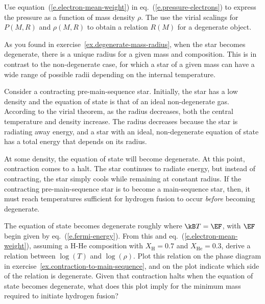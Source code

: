 \begin{exercisebox}
\label{ex.degenerate-mass-radius}
Use equation~(\ref{e.electron-mean-weight}) in eq.~(\ref{e.pressure-electrons}) to express the pressure as a function of mass density $\rho$. The use the virial scalings for $P(M,R)$ and $\rho(M,R)$ to obtain a relation $R(M)$ for a degenerate object.
\end{exercisebox}

As you found in exercise~\ref{ex.degenerate-mass-radius}, when the star becomes degenerate, there is a unique radius for a given mass and composition. This is in contrast to the non-degenerate case, for which a star of a given mass can have a wide range of possible radii depending on the internal temperature.

Consider a contracting pre-main-sequence star. Initially, the star has a low density and the equation of state is that of an ideal non-degenerate gas. According to the virial theorem, as the radius decreases, both the central temperature and density increase. 
The radius decreases because the star is radiating away energy, and a star with an ideal, non-degenerate equation of state has a total energy that depends on its radius.

At some density, the equation of state will become degenerate. At this point, contraction comes to a halt. The star continues to radiate energy, but instead of contracting, the star simply cools while remaining at constant radius. If the contracting pre-main-sequence star is to become a main-sequence star, then, it must reach temperatures sufficient for hydrogen fusion to occur \emph{before} becoming degenerate.

\begin{exercisebox}
\label{ex.minimum-stellar-mass}
The equation of state becomes degenerate roughly where $\kB T=\EF$, with $\EF$ begin given by eq.~(\ref{e.fermi-energy}). From this and eq.~(\ref{e.electron-mean-weight}), assuming a H-He composition with $X_{\mathrm{H}} = 0.7$ and $X_{\mathrm{He}}=0.3$, derive a relation between $\log(T)$ and $\log(\rho)$. Plot this relation on the phase diagram in exercise~\ref{ex.contraction-to-main-sequence}, and on the plot indicate which side of the relation is degenerate.
Given that contraction halts when the equation of state becomes degenerate, what does this plot imply for the minimum mass required to initiate hydrogen fusion?
\end{exercisebox}

